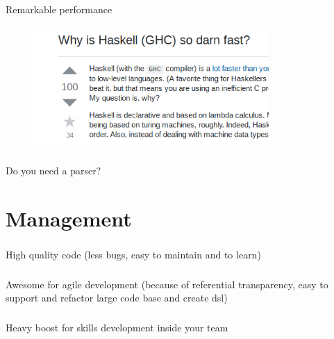 \documentclass[usenames,dvipsnames, 18pt, compress, aspectratio=169]{beamer}
\begin{document}
\begin{frame}
    \frametitle{}
    \begin{center}
    Remarkable performance
    \begin{figure}
        \includegraphics[width=0.8\textwidth,center]{haskell_fast.png}
    \end{figure}
    \end{center}
\end{frame}

\begin{frame}
    \frametitle{}
    \begin{center}
    Do you need a parser?
    \end{center}
\end{frame}

\fontsize{13pt}{14}\selectfont
\section{Management}
\fontsize{17pt}{18}\selectfont

\begin{frame}
    \frametitle{}
    \begin{center}
    High quality code (less bugs, easy to maintain and to learn)
    \end{center}
\end{frame}

\begin{frame}
    \frametitle{}
    \begin{center}
    Awesome for agile development (because of referential transparency, easy to
    support and refactor large code base and create dsl)
    \end{center}
\end{frame}

\begin{frame}
    \frametitle{}
    \begin{center}
    Heavy boost for skills development inside your team
    \end{center}
\end{frame}
\end{document}
